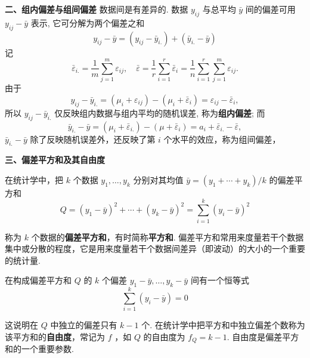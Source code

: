 \textbf{二、组内偏差与组间偏差}
数据间是有差异的. 数据 $y_{ij}$ 与总平均 $\bar{y}$ 间的偏差可用 $y_{ij} - \bar{y}$ 表示, 它可分解为两个偏差之和
\begin{equation}\label{eq:8.1.10}
  y_{ij}-\bar{y}=(y_{ij}-\bar{y}_{i.})+(\bar{y}_{i.}-\bar{y})
\end{equation}
记
\begin{equation*}
  \bar{\varepsilon}_{i.} =\frac{1}{m} \sum_{j=1}^{m} \varepsilon_{ij}, \quad \bar{\varepsilon}=\frac{1}{r} \sum_{i=1}^{r} \bar{\varepsilon}_{i} = \frac{1}{n} \sum_{i=1}^{r} \sum_{j=1}^{m} \varepsilon_{ij}.
\end{equation*}
由于
\begin{equation}\label{eq:8.1.11}
  y_{i j}-\bar{y}_{i.}=(\mu_{i}+\varepsilon_{i j})-(\mu_{i}+\bar{\varepsilon}_{i})=\varepsilon_{i j}-\bar{\varepsilon}_{i},
\end{equation}
所以 $y_{ij} - \bar{y}_{i.}$ 仅反映组内数据与组内平均的随机误差, 称为\textbf{组内偏差}; 而
\begin{equation}\label{eq:8.1.12}
  \bar{y}_{i.}-\bar{y} = (\mu_{i}+ \bar{\varepsilon}_{i.})-(\mu +\bar{\varepsilon}_{i})= a_i + \bar{\varepsilon}_{i.}-\bar{\varepsilon},
\end{equation}
$\bar{y}_{i.} - \bar{y}$ 除了反映随机误差外，还反映了第 $i$ 个水平的效应，称为组间偏差，

\textbf{三、偏差平方和及其自由度}

在统计学中，把 $k$ 个数据 $y_1,\ldots,y_k$ 分别对其均值 $\bar{y}=(y_1+\cdots+y_{k}) / k$ 的偏差平方和
\begin{equation*}
  Q=\left(y_{1}-\bar{y}\right)^{2}+\cdots+\left(y_{k}-\bar{y}\right)^{2}=\sum_{i=1}^{k}\left(y_{i}-\bar{y}\right)^{2}
\end{equation*}

称为 $k$ 个数据的\textbf{偏差平方和}，有时简称\textbf{平方和}. 偏差平方和常用来度量若干个数据集中或分散的程度，它是用来度量若干个数据间差异（即波动）的大小的一个重要的统计量.

在构成偏差平方和 $Q$ 的 $k$ 个偏差 $y_1 - \bar{y}, \ldots, y_{k} - \bar{y}$ 间有一个恒等式
\begin{equation*}
  \sum_{i=1}^{k}\left(y_{i}-\bar{y}\right)=0
\end{equation*}

这说明在 $Q$ 中独立的偏差只有 $k-1$ 个. 在统计学中把平方和中独立偏差个数称为该平方和的\textbf{自由度}，常记为 $f$ ，如 $Q$ 的自由度为 $f_{Q}=k-1$. 自由度是偏差平方和的一个重要参数.

